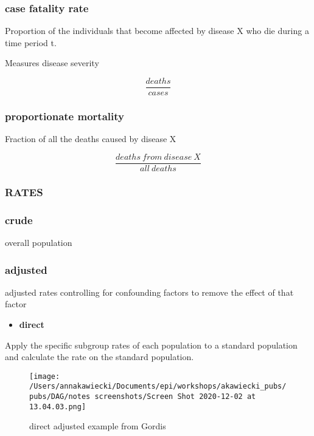 \documentclass[
]{article}
\providecommand{\tightlist}{%
  \setlength{\itemsep}{0pt}\setlength{\parskip}{0pt}}
\begin{document}
\hypertarget{case-fatality-rate}{%
\subsubsection{case fatality rate}\label{case-fatality-rate}}

Proportion of the individuals that become affected by disease X who die
during a time period t.

Measures disease severity

\[\frac{deaths}{cases}\]

\hypertarget{proportionate-mortality}{%
\subsubsection{proportionate mortality}\label{proportionate-mortality}}

Fraction of all the deaths caused by disease X

\[\frac{deaths\:from\:disease\:X}{all\:deaths}\]

\hypertarget{rates}{%
\subsubsection{RATES}\label{rates}}

\hypertarget{crude}{%
\subsubsection{crude}\label{crude}}

overall population

\hypertarget{adjusted}{%
\subsubsection{adjusted}\label{adjusted}}

adjusted rates controlling for confounding factors to remove the effect
of that factor

\begin{itemize}
\tightlist
\item
  \textbf{direct}
\end{itemize}

Apply the specific subgroup rates of each population to a standard
population and calculate the rate on the standard population.

\begin{figure}
\centering
\texttt{[image: /Users/annakawiecki/Documents/epi/workshops/akawiecki\_pubs/pubs/DAG/notes screenshots/Screen Shot 2020-12-02 at 13.04.03.png]}
\caption{direct adjusted example from Gordis}
\end{figure}
\end{document}
